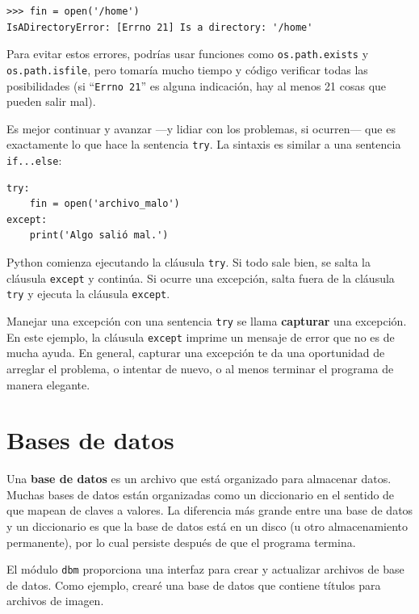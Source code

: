 \documentclass[10pt]{book}
\begin{document}
\begin{verbatim}
>>> fin = open('/home')
IsADirectoryError: [Errno 21] Is a directory: '/home'
\end{verbatim}
%
Para evitar estos errores, podrías usar funciones como {\tt os.path.exists}
y {\tt os.path.isfile}, pero tomaría mucho tiempo y código
verificar todas las posibilidades (si ``{\tt Errno 21}'' es alguna
indicación, hay al menos 21 cosas que pueden salir mal).

Es mejor continuar y avanzar ---y lidiar con los problemas, si
ocurren--- que es exactamente lo que hace la sentencia {\tt try}.  La
sintaxis es similar a una sentencia {\tt if...else}:

\begin{verbatim}
try:
    fin = open('archivo_malo')
except:
    print('Algo salió mal.')
\end{verbatim}
%
Python comienza ejecutando la cláusula {\tt try}.  Si todo sale
bien, se salta la cláusula {\tt except} y continúa.  Si ocurre
una excepción, salta fuera de la cláusula {\tt try} y
ejecuta la cláusula {\tt except}.

Manejar una excepción con una sentencia {\tt try} se llama {\bf
capturar} una excepción.  En este ejemplo, la cláusula {\tt except}
imprime un mensaje de error que no es de mucha ayuda.  En general,
capturar una excepción te da una oportunidad de arreglar el problema, o intentar
de nuevo, o al menos terminar el programa de manera elegante.


\section{Bases de datos}

Una {\bf base de datos} es un archivo que está organizado para almacenar datos.  Muchas
bases de datos están organizadas como un diccionario en el sentido de que mapean
de claves a valores.  La diferencia más grande entre una base de datos y un
diccionario es que la base de datos está en un disco (u otro almacenamiento
permanente), por lo cual persiste después de que el programa termina.   

El módulo {\tt dbm} proporciona una interfaz para crear
y actualizar archivos de base de datos.
Como ejemplo, crearé una base de datos
que contiene títulos para archivos de imagen.
\end{document}
